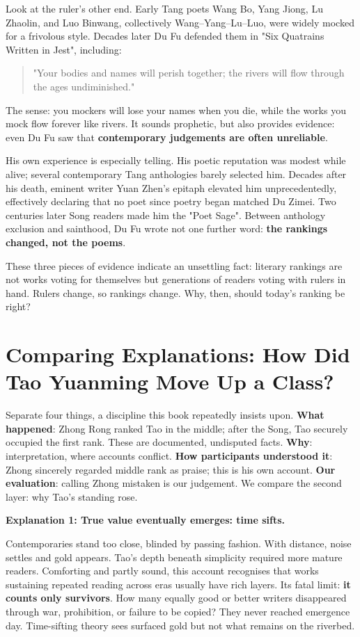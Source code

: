 Look at the ruler's other end. Early Tang poets Wang Bo, Yang Jiong, Lu Zhaolin, and Luo Binwang, collectively Wang--Yang--Lu--Luo, were widely mocked for a frivolous style. Decades later Du Fu defended them in "Six Quatrains Written in Jest", including:

\begin{quote}
"Your bodies and names will perish together; the rivers will flow through the ages undiminished."
\end{quote}
The sense: you mockers will lose your names when you die, while the works you mock flow forever like rivers. It sounds prophetic, but also provides evidence: even Du Fu saw that \textbf{contemporary judgements are often unreliable}.

His own experience is especially telling. His poetic reputation was modest while alive; several contemporary Tang anthologies barely selected him. Decades after his death, eminent writer Yuan Zhen's epitaph elevated him unprecedentedly, effectively declaring that no poet since poetry began matched Du Zimei. Two centuries later Song readers made him the "Poet Sage". Between anthology exclusion and sainthood, Du Fu wrote not one further word: \textbf{the rankings changed, not the poems}.

These three pieces of evidence indicate an unsettling fact: literary rankings are not works voting for themselves but generations of readers voting with rulers in hand. Rulers change, so rankings change. Why, then, should today's ranking be right?

\section[Three Accounts of Tao's Promotion]{Comparing Explanations: How Did Tao Yuanming Move Up a Class?}
Separate four things, a discipline this book repeatedly insists upon. \textbf{What happened}: Zhong Rong ranked Tao in the middle; after the Song, Tao securely occupied the first rank. These are documented, undisputed facts. \textbf{Why}: interpretation, where accounts conflict. \textbf{How participants understood it}: Zhong sincerely regarded middle rank as praise; this is his own account. \textbf{Our evaluation}: calling Zhong mistaken is our judgement. We compare the second layer: why Tao's standing rose.

\textbf{Explanation 1: True value eventually emerges: time sifts.}

Contemporaries stand too close, blinded by passing fashion. With distance, noise settles and gold appears. Tao's depth beneath simplicity required more mature readers. Comforting and partly sound, this account recognises that works sustaining repeated reading across eras usually have rich layers. Its fatal limit: \textbf{it counts only survivors}. How many equally good or better writers disappeared through war, prohibition, or failure to be copied? They never reached emergence day. Time-sifting theory sees surfaced gold but not what remains on the riverbed.

